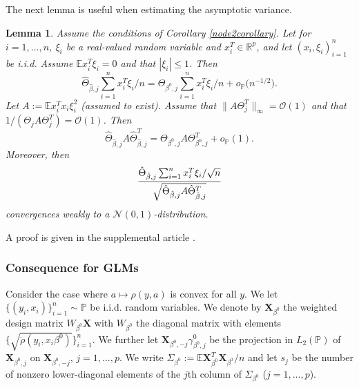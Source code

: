 \documentclass[aos,MSNbibl,dvips]{arximspdf}
\def\cal{\mathcal}
\newtheorem{lemm}{Lemma}[section]
\newcommand{\PP}{\mathbb{P}}
\newcommand{\EE}{\mathbb{E}}
\newcommand{\R}{\mathbb{R}}
\newcommand{\bx}{\mathbf{X}}
\begin{document}
The next lemma is useful when estimating the asymptotic variance.

\begin{lemm} \label{normallemma} Assume the conditions of Corollary
\ref{node2corollary}.
Let for $i=1, \ldots, n$, $\xi_i$ be a real-valued random variable
and $x_i^T \in\R^p$, and let
$( x_i, \xi_i)_{i=1}^n$ be i.i.d. Assume $\EE x_i^T \xi_i=0 $ and
that $| \xi_i | \le1 $.
Then
%
\[
\hat{\Theta}_{\hat{\beta},j} \sum_{i=1}^n
x_i^T \xi_i / n = \Theta _{\beta^0,j}
\sum_{i=1}^n x_i^T
\xi_i /n + {o}_{\PP} \bigl(n^{-1/2} \bigr).
%
\]
%
Let $A:= \EE x_i^T x_i \xi_i^2$ (assumed to exist). Assume that
$\| A \Theta_j^T \|_{\infty} = {\mathcal O} (1) $ and that $1/
(\Theta
_j A \Theta_j^T) = {\mathcal O} (1)$.
Then
%
\[
\hat{\Theta}_{\hat{\beta},j} A \hat{\Theta}_{\hat{\beta},j}^T =
\Theta_{\beta^0,j} A \Theta_{\beta^0,j}^T + o_{\PP} (
1). %
\]
%
Moreover, then
%
\[
{ \hat{\Theta}_{\hat{\beta},j} \sum_{i=1}^n x_i^T \xi_i /\sqrt
{n} \over
\sqrt{\hat{\Theta}_{\hat{\beta},j} A \hat{\Theta}_{\hat{\beta
},j}^T } } %
\]
%
convergences weakly to a ${\cal N} (0,1 )$-distribution.
\end{lemm}

A proof is given in the supplemental article \cite{supplement}.

\subsubsection{Consequence for GLMs}\label{subsecassglm}
Consider the case where $ a \mapsto\rho(y, a)$ is convex for all $y$.
We let $\{ (y_i, x_i ) \}_{i=1}^n \sim\PP$ be i.i.d. random
variables. We denote by
$\bx_{\beta^0}$ the weighted design matrix\vadjust{\goodbreak}
$W_{\beta^0} \bx$ with $W_{\beta^0}$ the diagonal matrix with elements
$\{ \sqrt{\ddot\rho(y_i, x_i \beta^0 ) }
\}_{i=1}^n $. We further let
$\bx_{\beta^0, -j} \gamma_{\beta^0, j }^0$ be the projection in $L_2
(\PP)$
of $\mathbf{X}_{\beta^0, j} $ on $\bx_{\beta^0, -j}$, $j=1,
\ldots,
p $. We write
$\Sigma_{\beta^0}:= \EE{\bx}_{\beta^0}^T \mathbf{X}_{\beta^0} / n$
and let $s_j$ be the number
of nonzero lower-diagonal elements of the $j$th column of $\Sigma
_{\beta
^0}$ ($j=1, \ldots, p$).
\end{document}
